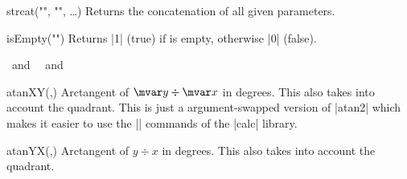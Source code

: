 \begin{multicols}{2}
\begin{math-function}{strcat("", "", …)}
\mathcommand
  Returns the concatenation of all given parameters.

\begin{codeexample}[]
\pgfmathresult
\end{codeexample}
\end{math-function}


\begin{math-function}{isEmpty("")}
\mathcommand
  Returns |1| (true) if  is empty, otherwise |0| (false).
\begin{codeexample}[]
 \pgfmathresult\ and\ 
    \pgfmathresult\ and\ 
\def\emptyText{}
\pgfmathparse{isEmpty("\emptyText")} \pgfmathresult
\end{codeexample}
\end{math-function}

\begin{math-function}{atanXY(,)}
\mathcommand
  Arctangent of $\mvar y\div \mvar x$ in degrees. This also takes into account the quadrant.
  This is just a argument-swapped version of |atan2| which makes it easier to use
  the |\p| commands of the |calc|\indexLibraryO{calc} library.
\begin{codeexample}[]
 \pgfmathresult
\end{codeexample}
\end{math-function}
\begin{math-function}{atanYX(,)}
\mathcommand
   Arctangent of $y\div x$ in degrees. This also takes into account the quadrant.
\begin{codeexample}[]
\pgfmathparse{atanYX(4,3)} \pgfmathresult
\end{codeexample}
\end{math-function}


\end{multicols}
